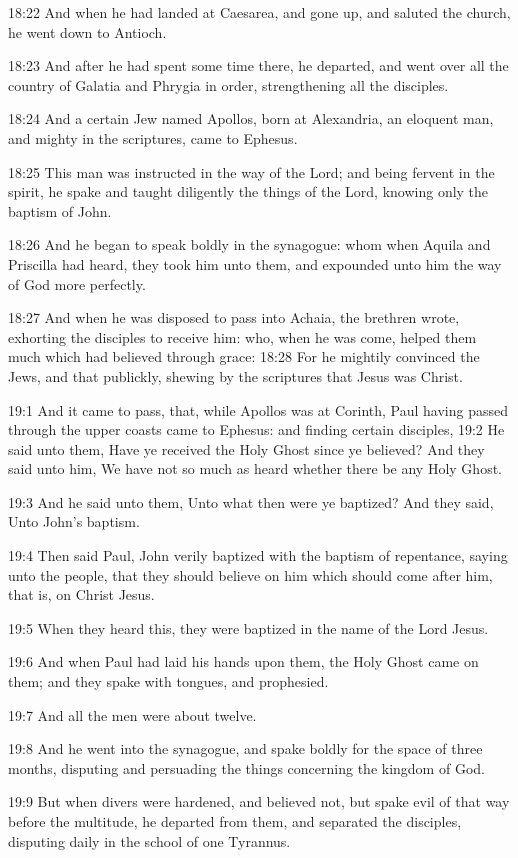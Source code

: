 18:22 And when he had landed at Caesarea, and gone up, and saluted the
church, he went down to Antioch.

18:23 And after he had spent some time there, he departed, and went
over all the country of Galatia and Phrygia in order, strengthening
all the disciples.

18:24 And a certain Jew named Apollos, born at Alexandria, an eloquent
man, and mighty in the scriptures, came to Ephesus.

18:25 This man was instructed in the way of the Lord; and being
fervent in the spirit, he spake and taught diligently the things of
the Lord, knowing only the baptism of John.

18:26 And he began to speak boldly in the synagogue: whom when Aquila
and Priscilla had heard, they took him unto them, and expounded unto
him the way of God more perfectly.

18:27 And when he was disposed to pass into Achaia, the brethren
wrote, exhorting the disciples to receive him: who, when he was come,
helped them much which had believed through grace: 18:28 For he
mightily convinced the Jews, and that publickly, shewing by the
scriptures that Jesus was Christ.

19:1 And it came to pass, that, while Apollos was at Corinth, Paul
having passed through the upper coasts came to Ephesus: and finding
certain disciples, 19:2 He said unto them, Have ye received the Holy
Ghost since ye believed?  And they said unto him, We have not so much
as heard whether there be any Holy Ghost.

19:3 And he said unto them, Unto what then were ye baptized? And they
said, Unto John's baptism.

19:4 Then said Paul, John verily baptized with the baptism of
repentance, saying unto the people, that they should believe on him
which should come after him, that is, on Christ Jesus.

19:5 When they heard this, they were baptized in the name of the Lord
Jesus.

19:6 And when Paul had laid his hands upon them, the Holy Ghost came
on them; and they spake with tongues, and prophesied.

19:7 And all the men were about twelve.

19:8 And he went into the synagogue, and spake boldly for the space of
three months, disputing and persuading the things concerning the
kingdom of God.

19:9 But when divers were hardened, and believed not, but spake evil
of that way before the multitude, he departed from them, and separated
the disciples, disputing daily in the school of one Tyrannus.

